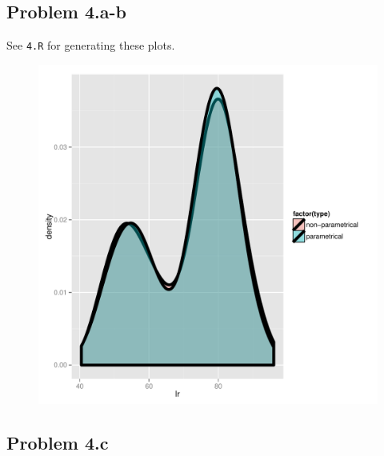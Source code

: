 \documentclass[letter]{article}
\begin{document}
\pagebreak
\subsection*{Problem 4.a-b}

See \texttt{4.R} for generating these plots. 
\begin{figure}[h]
 \includegraphics[scale=0.5]{figures/plot4b.pdf}
\end{figure}

\subsection*{Problem 4.c}


\pagebreak
\end{document}
